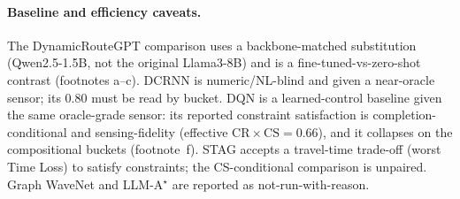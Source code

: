 \paragraph{Baseline and efficiency caveats.}
The DynamicRouteGPT comparison uses a backbone-matched substitution (Qwen2.5-1.5B, not the original
Llama3-8B) and is a fine-tuned-vs-zero-shot contrast (footnotes a--c). DCRNN is numeric/NL-blind and given
a near-oracle sensor; its 0.80 must be read by bucket. DQN is a learned-control baseline given the same
oracle-grade sensor: its reported constraint satisfaction is completion-conditional and sensing-fidelity
(effective $\mathrm{CR}\times\mathrm{CS}=0.66$), and it collapses on the compositional buckets (footnote~f).
STAG accepts a travel-time trade-off (worst Time Loss) to satisfy constraints; the CS-conditional
comparison is unpaired. Graph WaveNet and LLM-A$^\star$ are reported as not-run-with-reason.
